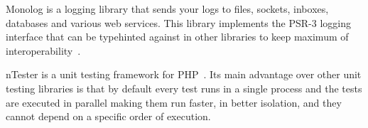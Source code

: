  \label{sec:theory:monolog}

Monolog is a logging library that sends your logs to files, sockets, inboxes, databases and various web services. This library implements the PSR-3 logging interface that can be typehinted against in other libraries to keep maximum of interoperability~\cite{monolog:readme}.

 \label{sec:theory:nette-tester}

\gls{nTester} is a unit testing framework for PHP~\cite{tester:docs}. Its main advantage over other unit testing libraries is that by default every test runs in a single process and the tests are executed in parallel making them run faster, in better isolation, and they cannot depend on a specific order of execution.

